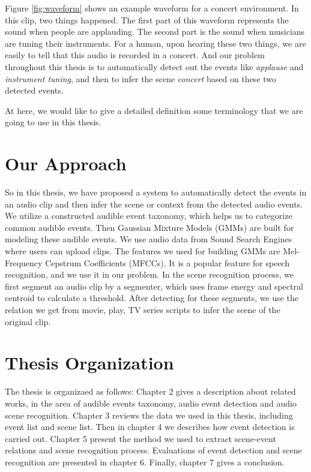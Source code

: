 Figure \ref{fig:waveform} shows an example waveform for a concert environment. 
In this clip, two things happened. 
The first part of this waveform represents the sound when people are applauding. 
The second part is the sound when musicians are tuning their instruments. 
For a human, upon hearing these two things, we are easily to tell that this audio is recorded in a concert. 
And our problem throughout this thesis is to automatically detect out the events like \textit{applause} and \textit{instrument tuning}, 
and then to infer the scene \textit{concert} based on these two detected events. 

At here, we would like to give a detailed definition some terminology that we are going to use in this thesis. 

\section{Our Approach}
So in this thesis, we have proposed a system to automatically detect the events in an audio clip and then infer the scene or context from the detected audio events. 
We utilize a constructed audible event taxonomy, which helps us to categorize common audible events. 
Then Gaussian Mixture Models (GMMs) are built for modeling these audible events. 
We use audio data from Sound Search Engines where users can upload clips. 
The features we used for building GMMs are Mel-Frequency Cepstrum Coefficients (MFCCs). 
It is a popular feature for speech recognition, and we use it in our problem. 
In the scene recognition process, we first segment an audio clip by a segmenter, which uses frame energy and spectral centroid to calculate a threshold. 
After detecting for these segments, we use the relation we get from movie, play, TV series scripts to infer the scene of the original clip.  

\section{Thesis Organization}
The thesis is organizaed as follows: Chapter 2 gives a description about related works, in the area of audible events taxonomy, audio event detection and audio scene recognition. 
Chapter 3 reviews the data we used in this thesis, including event list and scene list. 
Then in chapter 4 we describes how event detection is carried out. 
Chapter 5 present the method we used to extract scene-event relations and scene recognition process. 
Evaluations of event detection and scene recognition are presented in chapter 6. 
Finally, chapter 7 gives a conclusion.   

